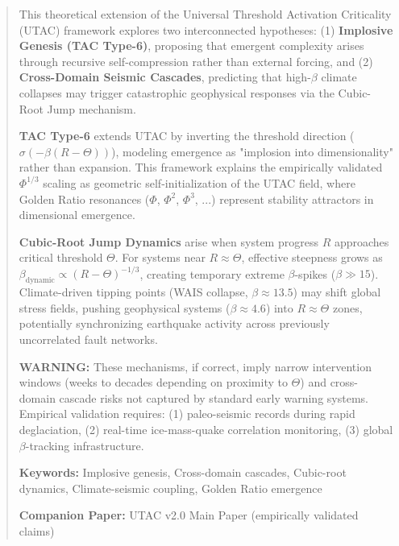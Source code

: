 \documentclass[11pt,a4paper]{article}
\begin{document}
\begin{abstract}
\noindent
This theoretical extension of the Universal Threshold Activation Criticality (UTAC) framework explores two interconnected hypotheses: (1) \textbf{Implosive Genesis (TAC Type-6)}, proposing that emergent complexity arises through recursive self-compression rather than external forcing, and (2) \textbf{Cross-Domain Seismic Cascades}, predicting that high-$\beta$ climate collapses may trigger catastrophic geophysical responses via the Cubic-Root Jump mechanism.

\textbf{TAC Type-6} extends UTAC by inverting the threshold direction ($\sigma(-\beta(R-\Theta))$), modeling emergence as "implosion into dimensionality" rather than expansion. This framework explains the empirically validated $\Phi^{1/3}$ scaling as geometric self-initialization of the UTAC field, where Golden Ratio resonances ($\Phi$, $\Phi^2$, $\Phi^3$, ...) represent stability attractors in dimensional emergence.

\textbf{Cubic-Root Jump Dynamics} arise when system progress $R$ approaches critical threshold $\Theta$. For systems near $R \approx \Theta$, effective steepness grows as $\beta_{\text{dynamic}} \propto (R-\Theta)^{-1/3}$, creating temporary extreme $\beta$-spikes ($\beta \gg 15$). Climate-driven tipping points (WAIS collapse, $\beta \approx 13.5$) may shift global stress fields, pushing geophysical systems ($\beta \approx 4.6$) into $R \approx \Theta$ zones, potentially synchronizing earthquake activity across previously uncorrelated fault networks.

\textbf{WARNING:} These mechanisms, if correct, imply narrow intervention windows (weeks to decades depending on proximity to $\Theta$) and cross-domain cascade risks not captured by standard early warning systems. Empirical validation requires: (1) paleo-seismic records during rapid deglaciation, (2) real-time ice-mass-quake correlation monitoring, (3) global $\beta$-tracking infrastructure.

\vspace{0.5em}
\noindent\textbf{Keywords:} Implosive genesis, Cross-domain cascades, Cubic-root dynamics, Climate-seismic coupling, Golden Ratio emergence

\vspace{0.5em}
\noindent\textbf{Companion Paper:} UTAC v2.0 Main Paper (empirically validated claims)
\end{abstract}
\end{document}
